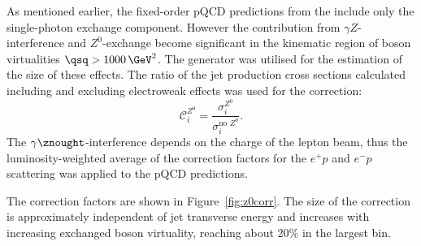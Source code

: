 As mentioned earlier, the fixed-order pQCD predictions from the \nlojet include only the single-photon exchange component. However the contribution from $\gamma Z$-interference and $Z^0$-exchange become significant in the kinematic region of boson virtualities $\qsq > 1000\, \GeV^{2}$. The \lepto generator was utilised for the estimation of the size of these effects. The ratio of the jet production cross sections calculated including and excluding electroweak effects was used for the correction:
\begin{equation}
 \mathcal{C}^\text{$Z^0$}_i = \frac{\sigma_i^\text{$Z^0$}}{\sigma_i^\text{no $Z^0$}}.
 \label{eq:z0corr}
\end{equation}
The $\gamma\znought$-interference depends on the charge of the lepton beam, thus the lumi\-nosity-weighted average of the correction factors for the $e^+p$ and $e^-p$ scattering was applied to the pQCD predictions.

The correction factors are shown in Figure~\ref{fig:z0corr}. The size of the correction is approximately independent of jet transverse energy and increases with increasing exchanged boson virtuality, reaching about 20\% in the largest \qsq bin.



